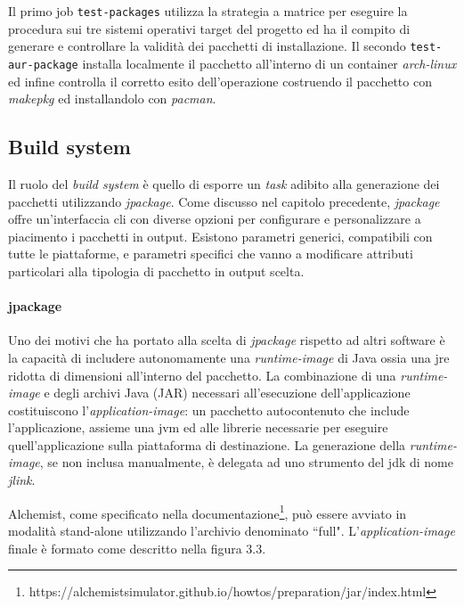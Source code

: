 Il primo job \texttt{test-packages} utilizza la strategia a matrice per eseguire la procedura sui tre sistemi operativi target del progetto ed ha il compito di generare e controllare la validità dei pacchetti di installazione. Il secondo \texttt{test-aur-package} installa localmente il pacchetto all'interno di un container \textit{arch-linux} ed infine controlla il corretto esito dell'operazione costruendo il pacchetto con \textit{makepkg} ed installandolo con \textit{pacman}.

\subsection{Build system}

Il ruolo del \textit{build system} è quello di esporre un \textit{task} adibito alla generazione dei pacchetti utilizzando \textit{jpackage}. Come discusso nel capitolo precedente, \textit{jpackage} offre un'interfaccia \ac{cli} con diverse opzioni per configurare e personalizzare a piacimento i pacchetti in output. Esistono parametri generici, compatibili con tutte le piattaforme, e parametri specifici che vanno a modificare attributi particolari alla tipologia di pacchetto in output scelta.

\paragraph{jpackage} Uno dei motivi che ha portato alla scelta di \textit{jpackage} rispetto ad altri software è la capacità di includere autonomamente una \textit{runtime-image} di Java ossia una \ac{jre} ridotta di dimensioni all'interno del pacchetto. La combinazione di una \textit{runtime-image} e degli archivi Java (JAR) necessari all'esecuzione dell'applicazione costituiscono l'\textit{application-image}: un pacchetto autocontenuto che include l'applicazione, assieme una \ac{jvm} ed alle librerie necessarie per eseguire quell'applicazione sulla piattaforma di destinazione. La generazione della \textit{runtime-image}, se non inclusa manualmente, è delegata ad uno strumento del jdk di nome \textit{jlink}.

Alchemist, come specificato nella documentazione\footnote{https://alchemistsimulator.github.io/howtos/preparation/jar/index.html}, può essere avviato in modalità stand-alone utilizzando l'archivio denominato ``full". L'\textit{application-image} finale è formato come descritto nella figura 3.3.

